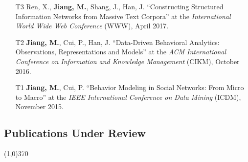 \documentclass[10pt]{article}
\newenvironment{myindentpar}[1]%
{\begin{list}{}%
         {\setlength{\leftmargin}{#1}}%
         \item[]%
}
{\end{list}}
\newcounter{list}
\begin{document}
\begin{myindentpar}{0.00cm}
\begin{enumerate}[leftmargin=.5cm]
\item[T3] Ren, X., \textbf{Jiang, M.}, Shang, J., Han, J. ``Constructing Structured Information Networks from Massive Text Corpora'' at the \textit{International World Wide Web Conference}  (WWW), April 2017.

\item[T2] \textbf{Jiang, M.}, Cui, P., Han, J. ``Data-Driven Behavioral Analytics: Observations, Representations and Models'' at the \textit{ACM International Conference on Information and Knowledge Management} (CIKM), October 2016.
		
\item[T1] \textbf{Jiang, M.}, Cui, P. ``Behavior Modeling in Social Networks: From Micro to Macro'' at the \textit{IEEE International Conference on Data Mining} (ICDM), November 2015.

\end{enumerate}

\end{myindentpar}

\subsection{\sc Publications Under Review}
\vspace{-0.4cm} \line(1,0){370} \vspace{-0.1cm}
\end{document}
